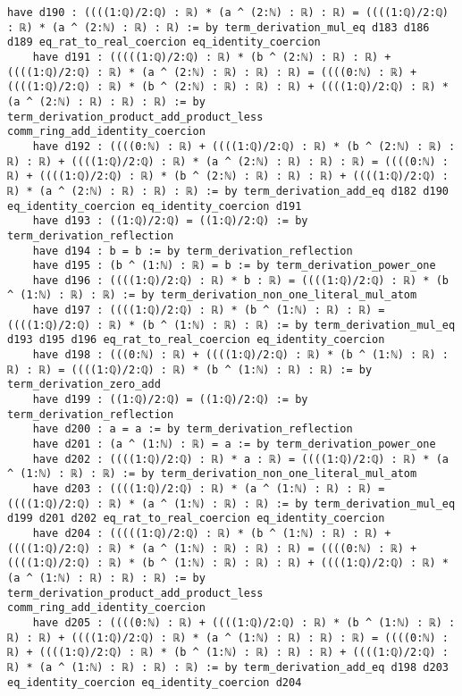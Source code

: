 \documentclass{article}
\begin{document}
\begin{tcolorbox}[colback=white!10, width=\linewidth]
\begin{lstlisting}[language=Lean4]
    have d190 : ((((1:ℚ)/2:ℚ) : ℝ) * (a ^ (2:ℕ) : ℝ) : ℝ) = ((((1:ℚ)/2:ℚ) : ℝ) * (a ^ (2:ℕ) : ℝ) : ℝ) := by term_derivation_mul_eq d183 d186 d189 eq_rat_to_real_coercion eq_identity_coercion
    have d191 : (((((1:ℚ)/2:ℚ) : ℝ) * (b ^ (2:ℕ) : ℝ) : ℝ) + ((((1:ℚ)/2:ℚ) : ℝ) * (a ^ (2:ℕ) : ℝ) : ℝ) : ℝ) = ((((0:ℕ) : ℝ) + ((((1:ℚ)/2:ℚ) : ℝ) * (b ^ (2:ℕ) : ℝ) : ℝ) : ℝ) + ((((1:ℚ)/2:ℚ) : ℝ) * (a ^ (2:ℕ) : ℝ) : ℝ) : ℝ) := by term_derivation_product_add_product_less comm_ring_add_identity_coercion
    have d192 : ((((0:ℕ) : ℝ) + ((((1:ℚ)/2:ℚ) : ℝ) * (b ^ (2:ℕ) : ℝ) : ℝ) : ℝ) + ((((1:ℚ)/2:ℚ) : ℝ) * (a ^ (2:ℕ) : ℝ) : ℝ) : ℝ) = ((((0:ℕ) : ℝ) + ((((1:ℚ)/2:ℚ) : ℝ) * (b ^ (2:ℕ) : ℝ) : ℝ) : ℝ) + ((((1:ℚ)/2:ℚ) : ℝ) * (a ^ (2:ℕ) : ℝ) : ℝ) : ℝ) := by term_derivation_add_eq d182 d190 eq_identity_coercion eq_identity_coercion d191
    have d193 : ((1:ℚ)/2:ℚ) = ((1:ℚ)/2:ℚ) := by term_derivation_reflection
    have d194 : b = b := by term_derivation_reflection
    have d195 : (b ^ (1:ℕ) : ℝ) = b := by term_derivation_power_one
    have d196 : ((((1:ℚ)/2:ℚ) : ℝ) * b : ℝ) = ((((1:ℚ)/2:ℚ) : ℝ) * (b ^ (1:ℕ) : ℝ) : ℝ) := by term_derivation_non_one_literal_mul_atom
    have d197 : ((((1:ℚ)/2:ℚ) : ℝ) * (b ^ (1:ℕ) : ℝ) : ℝ) = ((((1:ℚ)/2:ℚ) : ℝ) * (b ^ (1:ℕ) : ℝ) : ℝ) := by term_derivation_mul_eq d193 d195 d196 eq_rat_to_real_coercion eq_identity_coercion
    have d198 : (((0:ℕ) : ℝ) + ((((1:ℚ)/2:ℚ) : ℝ) * (b ^ (1:ℕ) : ℝ) : ℝ) : ℝ) = ((((1:ℚ)/2:ℚ) : ℝ) * (b ^ (1:ℕ) : ℝ) : ℝ) := by term_derivation_zero_add
    have d199 : ((1:ℚ)/2:ℚ) = ((1:ℚ)/2:ℚ) := by term_derivation_reflection
    have d200 : a = a := by term_derivation_reflection
    have d201 : (a ^ (1:ℕ) : ℝ) = a := by term_derivation_power_one
    have d202 : ((((1:ℚ)/2:ℚ) : ℝ) * a : ℝ) = ((((1:ℚ)/2:ℚ) : ℝ) * (a ^ (1:ℕ) : ℝ) : ℝ) := by term_derivation_non_one_literal_mul_atom
    have d203 : ((((1:ℚ)/2:ℚ) : ℝ) * (a ^ (1:ℕ) : ℝ) : ℝ) = ((((1:ℚ)/2:ℚ) : ℝ) * (a ^ (1:ℕ) : ℝ) : ℝ) := by term_derivation_mul_eq d199 d201 d202 eq_rat_to_real_coercion eq_identity_coercion
    have d204 : (((((1:ℚ)/2:ℚ) : ℝ) * (b ^ (1:ℕ) : ℝ) : ℝ) + ((((1:ℚ)/2:ℚ) : ℝ) * (a ^ (1:ℕ) : ℝ) : ℝ) : ℝ) = ((((0:ℕ) : ℝ) + ((((1:ℚ)/2:ℚ) : ℝ) * (b ^ (1:ℕ) : ℝ) : ℝ) : ℝ) + ((((1:ℚ)/2:ℚ) : ℝ) * (a ^ (1:ℕ) : ℝ) : ℝ) : ℝ) := by term_derivation_product_add_product_less comm_ring_add_identity_coercion
    have d205 : ((((0:ℕ) : ℝ) + ((((1:ℚ)/2:ℚ) : ℝ) * (b ^ (1:ℕ) : ℝ) : ℝ) : ℝ) + ((((1:ℚ)/2:ℚ) : ℝ) * (a ^ (1:ℕ) : ℝ) : ℝ) : ℝ) = ((((0:ℕ) : ℝ) + ((((1:ℚ)/2:ℚ) : ℝ) * (b ^ (1:ℕ) : ℝ) : ℝ) : ℝ) + ((((1:ℚ)/2:ℚ) : ℝ) * (a ^ (1:ℕ) : ℝ) : ℝ) : ℝ) := by term_derivation_add_eq d198 d203 eq_identity_coercion eq_identity_coercion d204

\end{lstlisting}
\end{tcolorbox}
\end{document}
